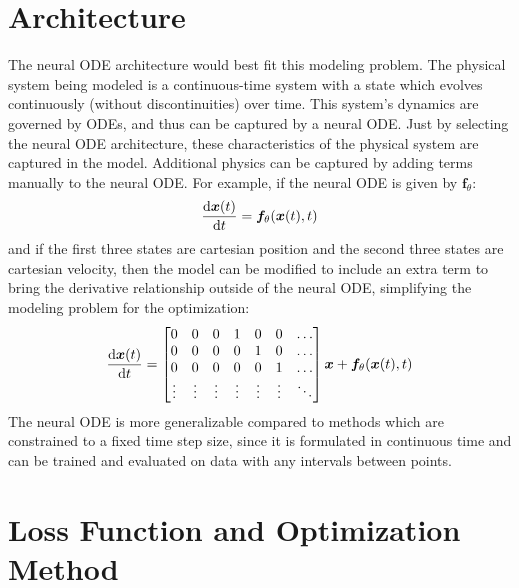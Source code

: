 \documentclass[11pt]{article}
\begin{document}
\section{Architecture}

The neural ODE architecture would best fit this modeling problem. The physical system being modeled is a continuous-time system with a state which evolves continuously (without discontinuities) over time. This system's dynamics are governed by ODEs, and thus can be captured by a neural ODE. Just by selecting the neural ODE architecture, these characteristics of the physical system are captured in the model. Additional physics can be captured by adding terms manually to the neural ODE. For example, if the neural ODE is given by $\boldsymbol{f}_\theta$:
\begin{equation}
    \frac{\text{d} \boldsymbol{x}(t)}{\text{d} t} = \boldsymbol{f}_\theta(\boldsymbol{x}(t), t)
\end{equation}
and if the first three states are cartesian position and the second three states are cartesian velocity, then the model can be modified to include an extra term to bring the derivative relationship outside of the neural ODE, simplifying the modeling problem for the optimization:
\begin{equation}
    \frac{\text{d} \boldsymbol{x}(t)}{\text{d} t} = \begin{bmatrix}
        0 & 0 & 0 & 1 & 0 & 0 & \dots \\
        0 & 0 & 0 & 0 & 1 & 0 & \dots \\
        0 & 0 & 0 & 0 & 0 & 1 & \dots \\
        \vdots & \vdots & \vdots & \vdots & \vdots & \vdots & \ddots
    \end{bmatrix} \boldsymbol{x} + \boldsymbol{f}_\theta(\boldsymbol{x}(t), t)
\end{equation}
The neural ODE is more generalizable compared to methods which are constrained to a fixed time step size, since it is formulated in continuous time and can be trained and evaluated on data with any intervals between points.

\section{Loss Function and Optimization Method}
\end{document}
